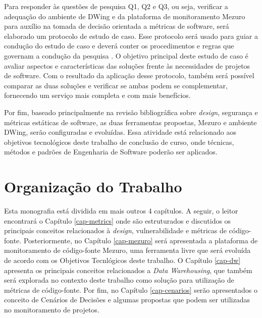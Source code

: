 Para responder às questões de pesquisa Q1, Q2 e Q3, ou seja, verificar a adequação do ambiente de DWing e da plataforma de monitoramento Mezuro para auxílio na tomada de decisão orientada a métricas de software, será elaborado um protocolo de estudo de caso.
%
Esse protocolo será usado para guiar a condução do estudo de caso e deverá conter os procedimentos e regras que governam a condução da pesquisa \cite{miles1994}.
%
O objetivo principal deste estudo de caso é avaliar aspectos e características das soluções frente às necessidades de projetos de software.
%
Com o resultado da aplicação desse protocolo, também será possível comparar as duas soluções e verificar se ambas podem se complementar, fornecendo um serviço mais completa e com mais benefícios.

Por fim, baseado principalmente na revisão bibliográfica sobre \emph{design}, segurança e métricas estáticas de software, as duas ferramentas propostas, Mezuro e ambiente DWing, serão configuradas e evoluídas.
%
Essa atividade está relacionado aos objetivos tecnológicos deste trabalho de conclusão de curso, onde técnicas, métodos e padrões de Engenharia de Software poderão ser aplicados.


\section{Organização do Trabalho}


Esta monografia está dividida em mais outros 4 capítulos. A seguir, o leitor encontrará o Capítulo \ref{cap-metrics} onde são estruturados e discutidos os principais conceitos relacionados à \emph{design}, vulnerabilidade e métricas de código-fonte. Posteriormente, no Capítulo \ref{cap-mezuro} será apresentada a plataforma de monitoramento de código-fonte Mezuro, uma ferramenta livre que será evoluída de acordo com os Objetivos Tecnlógicos deste trabalho. O Capítulo \ref{cap-dw} apresenta os principais conceitos relacionados a \emph{Data Warehousing}, que também será explorada no contexto deste trabalho como solução para utilização de métricas de código-fonte. Por fim, no Capítulo \ref{cap-cenarios} serão apresentados o conceito de Cenários de Decisões e algumas propostas que podem ser utilizadas no monitoramento de projetos.
